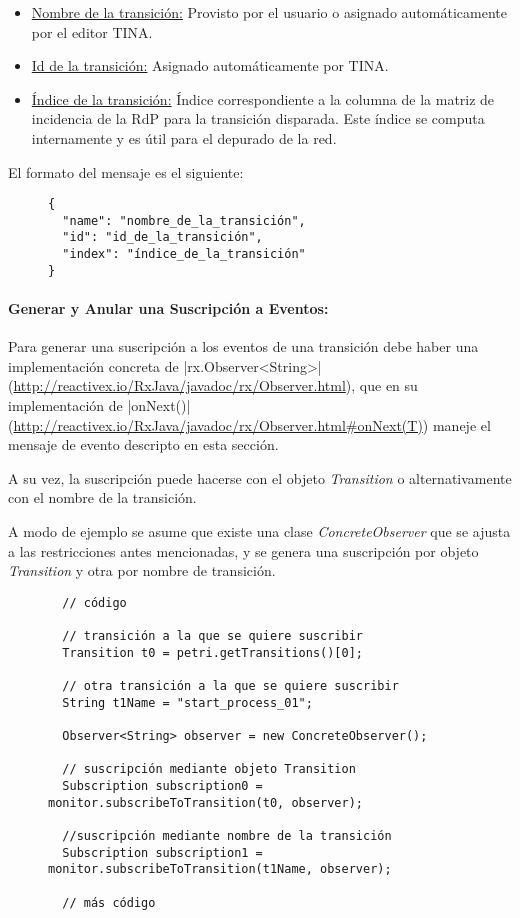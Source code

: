 \begin{itemize}
    \item \underline{Nombre de la transición:} Provisto por el usuario o
    asignado automáticamente por el editor TINA.
    \item \underline{Id de la transición:} Asignado automáticamente por TINA.
    \item \underline{Índice de la transición:} Índice correspondiente a la
    columna de la matriz de incidencia de la RdP para la transición disparada.
    Este índice se computa internamente y es útil para el depurado de la red.
\end{itemize}

El formato del mensaje es el siguiente:

\begin{figure}[H]
\centering
\begin{verbatim}
{
  "name": "nombre_de_la_transición",
  "id": "id_de_la_transición",
  "index": "índice_de_la_transición"
}
\end{verbatim}
\end{figure}

\paragraph{Generar y Anular una Suscripción a Eventos:}
Para generar una suscripción a los eventos de una transición debe haber una
implementación concreta de |rx.Observer<String>|
(\url{http://reactivex.io/RxJava/javadoc/rx/Observer.html}), que en su
implementación de |onNext()| 
(\url{http://reactivex.io/RxJava/javadoc/rx/Observer.html#onNext(T)})
maneje el mensaje de evento descripto en esta sección.

A su vez, la suscripción puede hacerse con el objeto \textit{Transition} o
alternativamente con el nombre de la transición.

A modo de ejemplo se asume que existe una clase \textit{ConcreteObserver} que se
ajusta a las restricciones antes mencionadas, y se genera una suscripción por
objeto \textit{Transition} y otra por nombre de transición.

\begin{figure}[H]
\centering
\begin{verbatim}
  // código
  
  // transición a la que se quiere suscribir
  Transition t0 = petri.getTransitions()[0]; 
  
  // otra transición a la que se quiere suscribir
  String t1Name = "start_process_01";
  
  Observer<String> observer = new ConcreteObserver();
  
  // suscripción mediante objeto Transition
  Subscription subscription0 = monitor.subscribeToTransition(t0, observer);
  
  //suscripción mediante nombre de la transición
  Subscription subscription1 = monitor.subscribeToTransition(t1Name, observer);
  
  // más código
\end{verbatim}
\end{figure}

